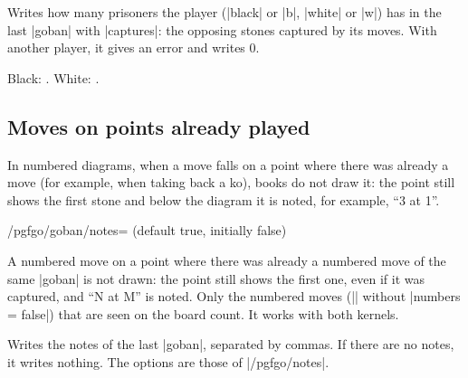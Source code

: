 	\begin{command}{\pgfgoprisoners{}}
		Writes how many prisoners the player (|black| or |b|, |white| or |w|) has in the last |goban| with |captures|: the opposing stones captured by its moves. With another player, it gives an error and writes 0.

		\begin{codeexample}[]

			\begin{goban}[captures]
			\end{goban}

			Black: . White: .
		\end{codeexample}
	\end{command}

	\subsection{Moves on points already played}
	\label{subsec:notas}

	In numbered diagrams, when a move falls on a point where there was already a move (for example, when taking back a ko), books do not draw it: the point still shows the first stone and below the diagram it is noted, for example, ``3 at 1''.

	\begin{key}{/pgfgo/goban/notes= (default true, initially false)}

		A numbered move on a point where there was already a numbered move of the same |goban| is not drawn: the point still shows the first one, even if it was captured, and ``N at M'' is noted. Only the numbered moves (|\moves| without |numbers = false|) that are seen on the board count. It works with both kernels.

		\begin{codeexample}[]

			\begin{goban}[notes]
			\end{goban}

			\pgfgomovenotes
		\end{codeexample}
	\end{key}

	\begin{command}{\pgfgomovenotes{}}
		Writes the notes of the last |goban|, separated by commas. If there are no notes, it writes nothing. The options are those of |/pgfgo/notes|.
	\end{command}

